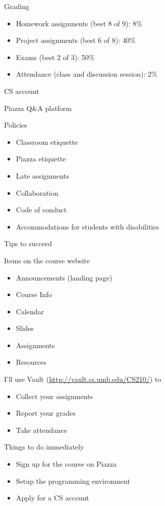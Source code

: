 \documentclass[8pt,a4paper,compress]{beamer}
\begin{document}
\begin{frame}[fragile]
\pause

Grading
\begin{itemize}
\item Homework assignments (best 8 of 9): 8\%
\item Project assignments (best 6 of 8): 40\%
\item Exams (best 2 of 3): 50\%
\item Attendance (class and discussion session): 2\%
\end{itemize}

\pause
\bigskip

CS account

\pause
\bigskip

Piazza Q\&A platform

\pause
\bigskip

Policies
\begin{itemize}
\item Classroom etiquette
\item Piazza etiquette
\item Late assignments
\item Collaboration
\item Code of conduct
\item Accommodations for students with disabilities
\end{itemize}

\pause
\bigskip

Tips to succeed
\end{frame}

\begin{frame}[fragile]
\pause

Items on the course website
\begin{itemize}
\item Announcements (landing page)
\item Course Info
\item Calendar
\item Slides 
\item Assignments
\item Resources
\end{itemize}

\pause
\bigskip

I'll use Vault (\href{http://vault.cs.umb.edu/CS210/}{http://vault.cs.umb.edu/CS210/}) to
\begin{itemize}
\item Collect your assignments
\item Report your grades
\item Take attendance
\end{itemize}

\pause
\bigskip

Things to do immediately
\begin{itemize}
\item Sign up for the course on Piazza
\item Setup the programming environment
\item Apply for a CS account
\end{itemize}
\end{frame}
\end{document}
